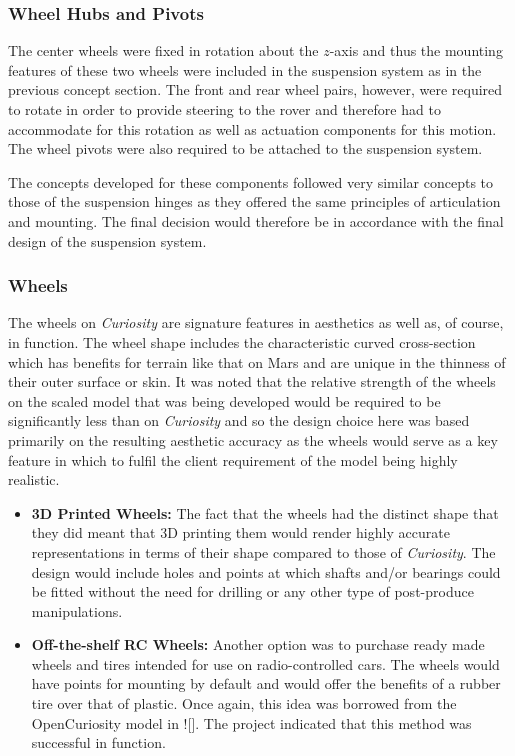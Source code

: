     \subsubsection{Wheel Hubs and Pivots}
      The center wheels were fixed in rotation about the $z$-axis and thus the mounting features of these two wheels were included in the suspension system as in the previous concept section. The front and rear wheel pairs, however, were required to rotate in order to provide steering to the rover and therefore had to accommodate for this rotation as well as actuation components for this motion. The wheel pivots were also required to be attached to the suspension system.
      
      The concepts developed for these components followed very similar concepts to those of the suspension hinges as they offered the same principles of articulation and mounting. The final decision would therefore be in accordance with the final design of the suspension system.
      
    \subsubsection{Wheels}
      The wheels on \textit{Curiosity} are signature features in aesthetics as well as, of course, in function. The wheel shape includes the characteristic curved cross-section which has benefits for terrain like that on Mars and are unique in the thinness of their outer surface or skin. It was noted that the relative strength of the wheels on the scaled model that was being developed would be required to be significantly less than on \textit{Curiosity} and so the design choice here was based primarily on the resulting aesthetic accuracy as the wheels would serve as a key feature in which to fulfil the client requirement of the model being highly realistic.
      
      \begin{itemize}
        \item \textbf{3D Printed Wheels:} The fact that the wheels had the distinct shape that they did meant that 3D printing them would render highly accurate representations in terms of their shape compared to those of \textit{Curiosity}. The design would include holes and points at which shafts and/or bearings could be fitted without the need for drilling or any other type of post-produce manipulations.
        
        \item \textbf{Off-the-shelf RC Wheels:} Another option was to purchase ready made wheels and tires intended for use on radio-controlled cars. The wheels would have points for mounting by default and would offer the benefits of a rubber tire over that of plastic. Once again, this idea was borrowed from the OpenCuriosity model in ![]. The project indicated that this method was successful in function.
      \end{itemize}
      
